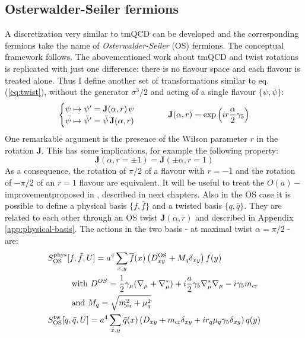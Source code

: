 \documentclass[english, LaM, oneside, noexaminfo]{sapthesis}
\newcommand{\oait}{$O(a)-$improvement}
\begin{document}
\subsection{Osterwalder-Seiler fermions}\label{sec:OS-regularization}
\noindent
A discretization very similar to tmQCD can be developed and the corresponding fermions take the name of {\it Osterwalder-Seiler} (OS) fermions.
The conceptual framework follows.
The abovementioned work about tmQCD and twist rotations is replicated with just one difference: there is no flavour space and each flavour is treated alone.
Thus I define another set of transformations similar to eq. (\ref{eq:twist}), without the generator $\sigma^3/2$ and acting of a single flavour $\{\psi,\bar \psi\}$:
\begin{equation}\label{eq:twistOS}
    \begin{cases}
        \psi \mapsto \psi' = \mathbf{J}(\alpha,r) \hspace*{0.5mm} \psi \\
        \bar \psi \mapsto \bar \psi' = \bar \psi \hspace*{0.5mm} \mathbf{J}(\alpha,r) 
    \end{cases}
    \hspace*{1cm}
    \mathbf{J}(\alpha,r) = \text{exp}\left(i r \frac{\alpha}{2} \gamma_5\right)
\end{equation}
One remarkable argument is the presence of the Wilson parameter $r$ in the rotation $\mathbf{J}$.
This has some implications, for example the following property:
\begin{equation*}
    \mathbf{J}(\alpha, r=\pm 1) = \mathbf{J}(\pm\alpha, r= 1)
\end{equation*}
As a consequence, the rotation of $\pi/2$ of a flavour with $r=-1$ and the rotation of $-\pi/2$ of an $r=1$ flavour are equivalent.
It will be useful to treat the \oait\space proposed in \cite{FR2}, described in next chapters.
\newline
Also in the OS case it is possible to define a physical basis $\{f,\bar f\}$ and a twisted basis $\{q,\bar q\}$.
They are related to each other through an OS twist $\mathbf{J}(\alpha, r)$ and described in Appendix \ref{app:physical-basis}.
The actions in the two basis - at maximal twist $\alpha = \pi/2$ - are:
\begin{equation*}
    \begin{aligned}
        & S^\text{phys}_\text{OS} [f,\bar{f},U] = a^4 \sum_{x,y} \overline{f} (x) \left( D_{xy}^\text{OS} + M_q \delta_{xy} \right) f (y) \\
        & \hspace*{1cm}\text{with } D^{OS} = \frac{1}{2}\gamma_\mu(\nabla_\mu+\nabla_\mu^*) + i\frac{a}{2}\gamma_5\nabla_\mu^*\nabla_\mu -i\gamma_5 m_{cr} \\
        & \hspace*{1cm}\text{and  } M_q = \sqrt{m_\text{cr}^2 + \mu_q^2}\\
        & S^\text{tw}_\text{OS}[q,\bar q, U] = a^4 \sum_{x,y} \bar q(x) \left( D_{xy} + m_\text{cr} \delta_{xy} + i r_q \mu_q\gamma_5 \delta_{xy} \right) q (y)  \\
    \end{aligned}
\end{equation*}
\end{document}
